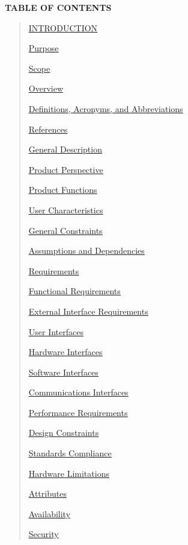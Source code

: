 \documentclass[
]{article}
\begin{document}
\textbf{TABLE OF CONTENTS}

\begin{quote}
\hyperref[section-1.-introduction]{\ul{INTRODUCTION}}

\hyperref[_ixwp5se860rt]{\ul{Purpose}}

\hyperref[documentation-conventions]{\ul{Scope}}

\hyperref[intended-audience]{\ul{Overview}}

\hyperref[_khs32z7vtz5h]{\ul{Definitions, Acronyms, and Abbreviations}}

\hyperref[_frw4je31to8t]{\ul{References}}

\hyperref[section-2.-general-description]{\ul{General Description}}

\hyperref[system-analysis]{\ul{Product Perspective}}

\hyperref[product-perspective]{\ul{Product Functions}}

\hyperref[product-function]{\ul{User Characteristics}}

\hyperref[general-constraints]{\ul{General Constraints}}

\hyperref[assumptions-and-dependencies]{\ul{Assumptions and
Dependencies}}

\hyperref[section-3.-requirements-specification]{\ul{Requirements}}

\hyperref[functional-requirements]{\ul{Functional Requirements}}

\hyperref[external-interface-requirements]{\ul{External Interface
Requirements}}

\hyperref[_jb5ksphe16w2]{\ul{User Interfaces}}

\hyperref[_eo0p461hhe3r]{\ul{Hardware Interfaces}}

\hyperref[_fpu3ytfo7r1]{\ul{Software Interfaces}}

\hyperref[_dxgri1jo8rz6]{\ul{Communications Interfaces}}

\hyperref[_ucoyn2yvl6c3]{\ul{Performance Requirements}}

\hyperref[design-constraints]{\ul{Design Constraints}}

\hyperref[_kj9rygdikkwy]{\ul{Standards Compliance}}

\hyperref[_i0u468c6zuoi]{\ul{Hardware Limitations}}

\hyperref[nonfunctional-requirements]{\ul{Attributes}}

\hyperref[performance]{\ul{Availability}}

\hyperref[security]{\ul{Security}}


\end{quote}
\end{document}

